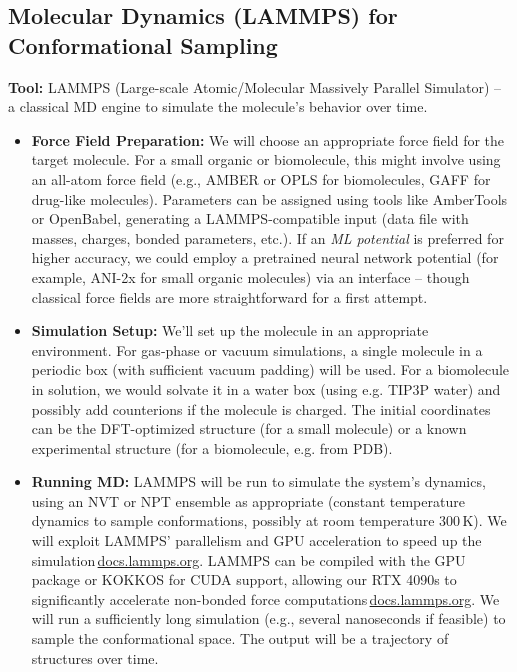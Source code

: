 \documentclass[11pt]{article}
\begin{document}
\subsection{Molecular Dynamics (LAMMPS) for Conformational Sampling}
\textbf{Tool:} LAMMPS (Large-scale Atomic/Molecular Massively Parallel Simulator) -- a classical MD engine to simulate the molecule’s behavior over time.

\begin{itemize}
  \item \textbf{Force Field Preparation:} We will choose an appropriate force field for the target molecule. For a small organic or biomolecule, this might involve using an all-atom force field (e.g., AMBER or OPLS for biomolecules, GAFF for drug-like molecules). Parameters can be assigned using tools like AmberTools or OpenBabel, generating a LAMMPS-compatible input (data file with masses, charges, bonded parameters, etc.). If an \emph{ML potential} is preferred for higher accuracy, we could employ a pretrained neural network potential (for example, ANI-2x for small organic molecules) via an interface -- though classical force fields are more straightforward for a first attempt.
  \item \textbf{Simulation Setup:} We’ll set up the molecule in an appropriate environment. For gas-phase or vacuum simulations, a single molecule in a periodic box (with sufficient vacuum padding) will be used. For a biomolecule in solution, we would solvate it in a water box (using e.g. TIP3P water) and possibly add counterions if the molecule is charged. The initial coordinates can be the DFT-optimized structure (for a small molecule) or a known experimental structure (for a biomolecule, e.g. from PDB).
  \item \textbf{Running MD:} LAMMPS will be run to simulate the system’s dynamics, using an NVT or NPT ensemble as appropriate (constant temperature dynamics to sample conformations, possibly at room temperature 300\,K). We will exploit LAMMPS’ parallelism and GPU acceleration to speed up the simulation\,\href{https://docs.lammps.org/Intro_overview.html\#:\~:text=clusters\%20and\%20supercomputers,threading\%2C\%20vectorization\%2C\%20and\%20GPU\%20acceleration}{docs.lammps.org}. LAMMPS can be compiled with the GPU package or KOKKOS for CUDA support, allowing our RTX 4090s to significantly accelerate non-bonded force computations\,\href{https://docs.lammps.org/Intro_overview.html\#:\~:text=clusters\%20and\%20supercomputers,threading\%2C\%20vectorization\%2C\%20and\%20GPU\%20acceleration}{docs.lammps.org}. We will run a sufficiently long simulation (e.g., several nanoseconds if feasible) to sample the conformational space. The output will be a trajectory of structures over time.

\end{itemize}
\end{document}
